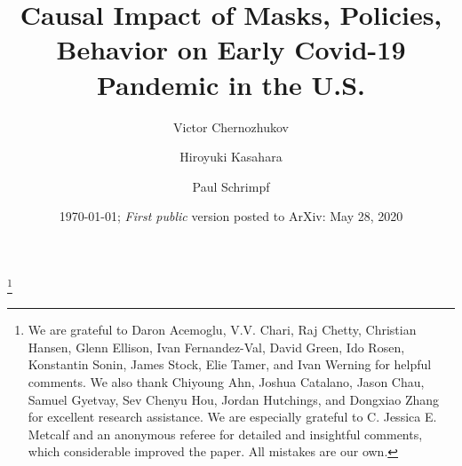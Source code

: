 \documentclass[11pt,reqno,letter]{amsart}
\theoremstyle{definition}
\begin{document}
\title[Causal Impact of Masks, Policies, Behavior]
{Causal Impact of Masks, Policies, Behavior on Early Covid-19 Pandemic in the U.S.}\thanks{We are grateful to Daron Acemoglu, V.V. Chari, Raj Chetty,  Christian Hansen, Glenn Ellison, Ivan Fernandez-Val, David Green,  Ido Rosen, Konstantin Sonin, James Stock, Elie Tamer, and Ivan Werning for helpful comments. We also thank Chiyoung Ahn,
Joshua Catalano,  Jason Chau, Samuel Gyetvay, Sev Chenyu Hou,
Jordan Hutchings, and Dongxiao Zhang  for excellent research assistance.  We are especially grateful
to   C. Jessica E. Metcalf and an anonymous referee for detailed and insightful comments,
which considerable improved the paper. All mistakes are our own. }


\author{Victor Chernozhukov}
\address{Department of Economics and Center for Statistics and Data Science, MIT,  MA 02139}
\author{Hiroyuki Kasahara}
\address{ Vancouver School of Economics, UBC, 6000 Iona Drive, Vancouver, BC.}

\author{Paul Schrimpf}
\address{ Vancouver School of Economics, UBC, 6000 Iona Drive, Vancouver, BC.}


\date{\today; \textit{First public} version posted to ArXiv:  May 28, 2020}
\end{document}
